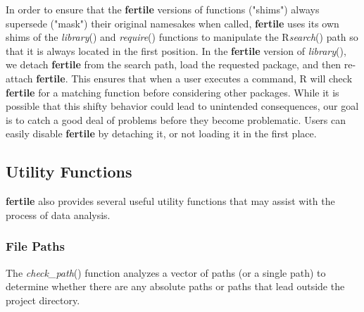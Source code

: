 \documentclass[APA,LATO1COL]{WileyNJD-v2}\usepackage[]{graphicx}\usepackage[]{color}
\newcommand{\R}{\textsf{R}\xspace}
\newcommand{\pkg}[1]{\textbf{#1}}
\newcommand{\func}[1]{\textit{#1}()}
\begin{document}
In order to ensure that the \pkg{fertile} versions of functions ("shims") always supersede ("mask") their original namesakes when called, \pkg{fertile} uses its own shims of the \func{library} and \func{require} functions to  manipulate the \R \func{search} path so that it is always located in the first position. In the \pkg{fertile} version of \func{library}, we detach \pkg{fertile} from the search path, load the requested package, and then re-attach \pkg{fertile}. This ensures that when a user executes a command, \R will check \pkg{fertile} for a matching function before considering other packages. While it is possible that this shifty behavior could lead to unintended consequences, our goal is to catch a good deal of problems before they become problematic. Users can easily disable \pkg{fertile} by detaching it, or not loading it in the first place. 


\subsection{Utility Functions}

\pkg{fertile} also provides several useful utility functions that may assist with the process of data analysis. 

\subsubsection{File Paths}

The \func{check\_path} function analyzes a vector of paths (or a single path) to determine whether there are any absolute paths or paths that lead outside the project directory.
\end{document}
